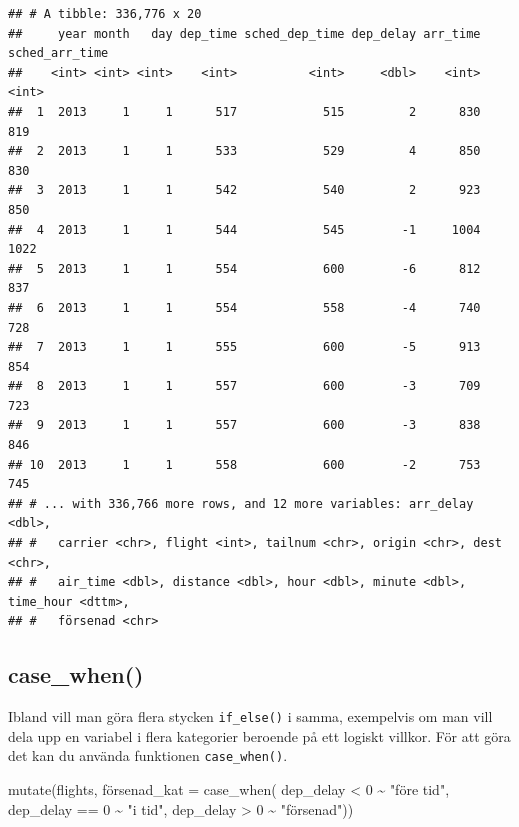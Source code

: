 \documentclass[
]{book}
\newenvironment{Shaded}{\begin{snugshade}}{\end{snugshade}}
\newcommand{\AttributeTok}[1]{\textcolor[rgb]{0.77,0.63,0.00}{#1}}
\newcommand{\DecValTok}[1]{\textcolor[rgb]{0.00,0.00,0.81}{#1}}
\newcommand{\FunctionTok}[1]{\textcolor[rgb]{0.00,0.00,0.00}{#1}}
\newcommand{\NormalTok}[1]{#1}
\newcommand{\SpecialCharTok}[1]{\textcolor[rgb]{0.00,0.00,0.00}{#1}}
\newcommand{\StringTok}[1]{\textcolor[rgb]{0.31,0.60,0.02}{#1}}
\begin{document}
\begin{verbatim}
## # A tibble: 336,776 x 20
##     year month   day dep_time sched_dep_time dep_delay arr_time sched_arr_time
##    <int> <int> <int>    <int>          <int>     <dbl>    <int>          <int>
##  1  2013     1     1      517            515         2      830            819
##  2  2013     1     1      533            529         4      850            830
##  3  2013     1     1      542            540         2      923            850
##  4  2013     1     1      544            545        -1     1004           1022
##  5  2013     1     1      554            600        -6      812            837
##  6  2013     1     1      554            558        -4      740            728
##  7  2013     1     1      555            600        -5      913            854
##  8  2013     1     1      557            600        -3      709            723
##  9  2013     1     1      557            600        -3      838            846
## 10  2013     1     1      558            600        -2      753            745
## # ... with 336,766 more rows, and 12 more variables: arr_delay <dbl>,
## #   carrier <chr>, flight <int>, tailnum <chr>, origin <chr>, dest <chr>,
## #   air_time <dbl>, distance <dbl>, hour <dbl>, minute <dbl>, time_hour <dttm>,
## #   försenad <chr>
\end{verbatim}

\hypertarget{case_when}{%
\subsection{case\_when()}\label{case_when}}

Ibland vill man göra flera stycken \texttt{if\_else()} i samma, exempelvis om man vill dela upp en variabel i flera kategorier beroende på ett logiskt villkor. För att göra det kan du använda funktionen \texttt{case\_when()}.

\begin{Shaded}
\begin{Highlighting}[]
\FunctionTok{mutate}\NormalTok{(flights, försenad}\AttributeTok{\_kat =} \FunctionTok{case\_when}\NormalTok{(}
\NormalTok{dep\_delay }\SpecialCharTok{\textless{}} \DecValTok{0} \SpecialCharTok{\textasciitilde{}} \StringTok{"före tid"}\NormalTok{,}
\NormalTok{dep\_delay }\SpecialCharTok{==} \DecValTok{0} \SpecialCharTok{\textasciitilde{}} \StringTok{"i tid"}\NormalTok{,}
\NormalTok{dep\_delay }\SpecialCharTok{\textgreater{}} \DecValTok{0} \SpecialCharTok{\textasciitilde{}} \StringTok{"försenad"}\NormalTok{)) }
\end{Highlighting}
\end{Shaded}
\end{document}
